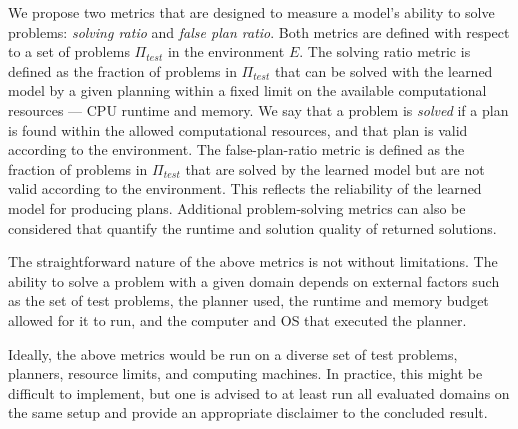 \documentclass{article}
\theoremstyle{definition}
\theoremstyle{remark}
\newcommand{\ptest}{\ensuremath{\Pi_{\textit{test}}}\xspace}
\newcommand{\realm}{{\ensuremath{M^*}}\xspace}
\newif\ifaddcomments
\newcommand{\roni}[1]{\ifaddcomments{\textcolor{red}{[Roni: #1]}}\fi}
\newcommand{\mauro}[1]{\ifaddcomments{\textcolor{green}{[Mauro: #1]}}\fi}
\newcommand{\gregor}[1]{\ifaddcomments{\textcolor{orange}{[Gregor: #1]}}\fi}
\newcommand{\cm}[1]{\ifaddcomments{\textcolor{olive}{[Christian: #1]}}\fi}
\begin{document}
We propose two metrics that are designed to measure a model's ability to solve problems: \emph{solving ratio} and \emph{false plan ratio}. 
Both metrics are defined with respect to a set of problems \ptest in the environment $E$. 
The solving ratio metric is defined as the fraction of problems in \ptest that can be solved with the learned model by a given planning within a fixed limit on the available computational resources --- CPU runtime and memory.
We say that a problem is \emph{solved} if a plan is found within the allowed computational resources, and that plan is valid according to the environment. 
The false-plan-ratio metric is defined as the fraction of problems in \ptest that are solved by the learned model but are not valid according to the environment. This reflects the reliability of the learned model for producing plans. 
Additional problem-solving metrics can also be considered that quantify the runtime and solution quality of returned solutions. 

The straightforward nature of the above metrics is not without limitations. The ability to solve a problem with a given domain depends on external factors such as the set of test problems, the planner used, the runtime and memory budget allowed for it to run, and the computer and OS that executed the planner.
\gregor{Theorem provers and proof assistants, e.g., Lean, sometimes use ``heartbearts'' (\url{https://florisvandoorn.com/carleson/docs/Lean/Util/Heartbeats.html}) instead of time. They measure elementary orations and bound their number. This ensures reproducibility across different machines. For us this could e.g.\ be number of expanded states. Or the number of times an effect is applied -- this would also include computation effort for heuristics.}
Ideally, the above metrics would be run on a diverse set of test problems, planners, resource limits, and computing machines. In practice, this might be difficult to implement, but one is advised to at least run all evaluated domains on the same setup and provide an appropriate disclaimer to the concluded result. 

\roni{TODO: Add metric on the runtime of solving the problem.}
\roni{TODO: Discussion: what about a metric on how many real plans can be validated by the learned model.}
\roni{TODO: Maybe: add some unsolvability detection metrics?}
\cm{In our work on aligning (which is very closely related, it seems!), we computed both (1) if the plans found using P and M validate on M* and (2) if the plans found using P and M* validate on M. You need assumptions on the action names+parameters, but then can test (via VAL) both ways.}
\gregor{Agree! I have been using this in teaching as well: generate plans for both $P$ and $\realm$.}
\end{document}
